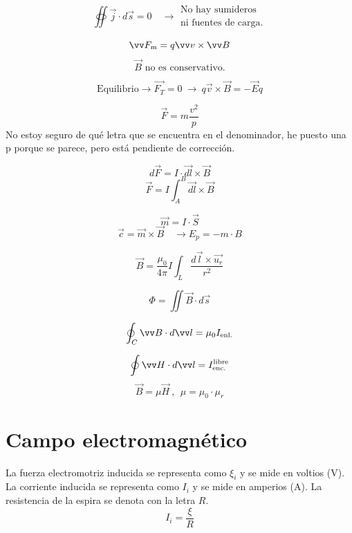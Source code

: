 \documentclass[a4paper]{book}
\begin{document}
\begin{landscape}
\begin{fleqn}
\begin{multicols}{4}
		\[\oiint{\vec{j}\cdot d\vec{s}}=0 \quad \longrightarrow \begin{array}{l}
				\text{No hay sumideros} \\
				\text{ni fuentes de carga.}
			\end{array}\]

		\[\vec{F\subtext{m}}=q \vec{v} \times \vec{B}\]
		\[\vec{B} \text{ no es conservativo.}\]

		\[\text{Equilibrio}\longrightarrow \vec{F_T}=0 \ \longrightarrow \ q \vec{v} \times \vec{B} = - \vec{E} q \]

		\[\vec{F}=m\frac{v^2}{p}\]
		No estoy seguro de qué letra que se encuentra en el denominador, he puesto una p porque se parece, pero está pendiente de corrección.

		\[d\vec{F}=I\cdot \vec{dl}\times \vec{B}\]
		\[\vec{F}=I\int_A^B{\vec{dl}\times\vec{B}}\]

		\[\vec{m}=I\cdot \vec{S}\]
		\[\vec{c}=\vec{m}\times \vec{B} \quad \longrightarrow E_p =-m\cdot B\]

		\[\vec{B}=\frac{\mu _0}{4\pi} I \int_L{\frac{d\vec{l}\times\vec{u_r}}{r^2}} \]

		\[\Phi = \iint{\vec{B}\cdot d\vec{s}}\]

		\[\oint_C{\vec{B}\cdot d\vec{l}}=\mu _0 I\subtext{enl.}\]

		\[\oint{\vec{H}\cdot d\vec{l}}= I^{\text{libre}}\subtext{enc.} \]\[ \vec{B}=\mu \vec{H} \ , \ \ \mu = \mu _0 \cdot \mu _r\]


	\end{multicols}
\end{fleqn}

\newpage
\section{Campo electromagnético}
\begin{fleqn}
	\begin{multicols}{4}

		\noindent La fuerza electromotriz inducida se representa como $\xi_i$ y se mide en voltios (V). La corriente inducida se representa como $I_i$ y se mide en amperios (A). La resistencia de la espira se denota con la letra $R$.
		\[I_i=\frac{\xi}{R}\]


\end{multicols}
\end{fleqn}
\end{landscape}
\end{document}
